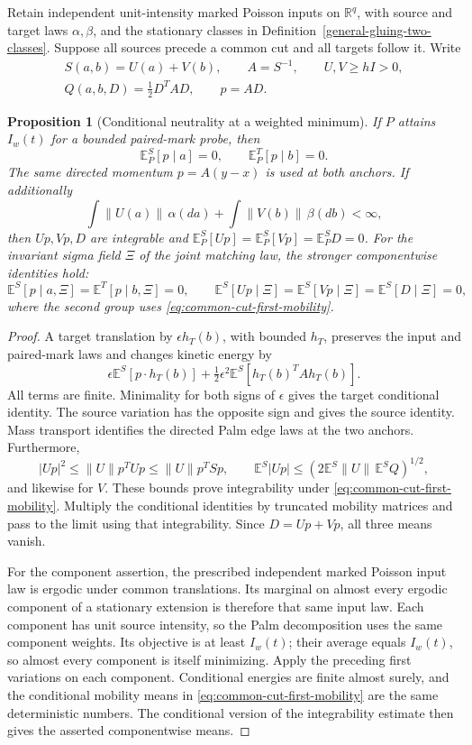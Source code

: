\documentclass[11pt,reqno]{amsart}
\newtheorem{proposition}[theorem]{Proposition}
\theoremstyle{definition}
\theoremstyle{remark}
\numberwithin{equation}{section}
\newcommand{\R}{\mathbb R}
\newcommand{\E}{\mathbb E}
\begin{document}
Retain independent unit-intensity marked Poisson inputs on \(\R^q\),
with source and target laws \(\alpha,\beta\), and the stationary
classes in Definition~\ref{general-gluing-two-classes}. Suppose all sources precede
a common cut and all targets follow it. Write
\[
 \begin{gathered}
 S(a,b)=U(a)+V(b),\qquad A=S^{-1},\qquad U,V\ge hI>0,\\
 Q(a,b,D)=\tfrac12D^TAD,\qquad p=AD.
 \end{gathered}
\]
\begin{proposition}[Conditional neutrality at a weighted minimum]
\label{prop:common-cut-conditional-centering}
If \(P\) attains \(I_w(t)\) for a bounded paired-mark probe, then
\[
 \E_P^S[p\mid a]=0,\qquad \E_P^T[p\mid b]=0.
\]
The same directed momentum \(p=A(y-x)\) is used at both anchors.
If additionally
\begin{equation}
\label{eq:common-cut-first-mobility}
 \int\|U(a)\|\,\alpha(da)+\int\|V(b)\|\,\beta(db)<\infty,
\end{equation}
then \(Up,Vp,D\) are integrable and
\(\E_P^S[Up]=\E_P^S[Vp]=\E_P^S D=0\).
For the invariant sigma field \(\Xi\) of the joint matching law,
the stronger componentwise identities hold:
\[
 \E^S[p\mid a,\Xi]=\E^T[p\mid b,\Xi]=0,\qquad
 \E^S[Up\mid\Xi]=\E^S[Vp\mid\Xi]=\E^S[D\mid\Xi]=0,
\]
where the second group uses \eqref{eq:common-cut-first-mobility}.
\end{proposition}
\begin{proof}
A target translation by \(\epsilon h_T(b)\), with bounded \(h_T\),
preserves the input and paired-mark laws and changes kinetic energy by
\[
 \epsilon\E^S[p\cdot h_T(b)]
 +\tfrac12\epsilon^2\E^S[h_T(b)^TAh_T(b)].
\]
All terms are finite. Minimality for both signs of \(\epsilon\)
gives the target conditional identity. The source variation has the
opposite sign and gives the source identity. Mass transport identifies
the directed Palm edge laws at the two anchors. Furthermore,
\[
 |Up|^2\le\|U\|p^TUp\le\|U\|p^TSp,\qquad
 \E^S|Up|\le(2\E^S\|U\|\,\E^S Q)^{1/2},
\]
and likewise for \(V\). These bounds prove integrability under
\eqref{eq:common-cut-first-mobility}. Multiply the conditional
identities by truncated mobility matrices and pass to the limit using
that integrability. Since \(D=Up+Vp\), all three means vanish.

For the component assertion, the prescribed independent marked Poisson
input law is ergodic under common translations. Its marginal on almost
every ergodic component of a stationary extension is therefore that same
input law. Each component has unit source intensity, so the Palm
decomposition uses the same component weights. Its objective is at
least \(I_w(t)\); their average equals \(I_w(t)\), so almost every
component is itself minimizing. Apply the preceding first variations
on each component. Conditional energies are finite almost surely, and
the conditional mobility means in \eqref{eq:common-cut-first-mobility}
are the same deterministic numbers. The conditional version of the
integrability estimate then gives the asserted componentwise means.
\end{proof}
\end{document}
